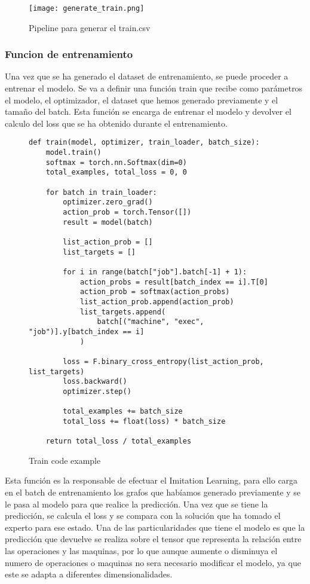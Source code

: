 \begin{figure}[ht]
    \centering
    \texttt{[image: generate\_train.png]}
    \caption{Pipeline para generar el train.csv}
    \label{fig:trainingpipeline}
\end{figure}

\subsubsection{Funcion de entrenamiento}
Una vez que se ha generado el dataset de entrenamiento, se puede proceder a entrenar el modelo.
Se va a definir una función train que recibe como parámetros el modelo, el optimizador, el dataset
que hemos generado previamente y el tamaño del batch. Esta función se encarga de entrenar el modelo
y devolver el calculo del loss que se ha obtenido durante el entrenamiento.\medskip

\begin{figure}[ht]
\begin{lstlisting}
def train(model, optimizer, train_loader, batch_size):
    model.train()
    softmax = torch.nn.Softmax(dim=0)
    total_examples, total_loss = 0, 0

    for batch in train_loader:
        optimizer.zero_grad()
        action_prob = torch.Tensor([])
        result = model(batch)

        list_action_prob = []
        list_targets = []

        for i in range(batch["job"].batch[-1] + 1):
            action_probs = result[batch_index == i].T[0]
            action_prob = softmax(action_probs)
            list_action_prob.append(action_prob)
            list_targets.append(
                batch[("machine", "exec", "job")].y[batch_index == i]
            )

        loss = F.binary_cross_entropy(list_action_prob, list_targets)
        loss.backward()
        optimizer.step()

        total_examples += batch_size
        total_loss += float(loss) * batch_size

    return total_loss / total_examples 
\end{lstlisting}\medskip
    \caption{Train code example}
    \label{fig:traincode}
\end{figure}

Esta función es la responsable de efectuar el Imitation Learning, para ello carga en el
batch de entrenamiento los grafos que habíamos generado previamente y se le pasa al modelo para que
realice la predicción. Una vez que se tiene la predicción, se calcula el loss y se compara
con la solución que ha tomado el experto para ese estado. Una de las particularidades que
tiene el modelo es que la predicción que devuelve se realiza sobre el tensor que representa
la relación entre las operaciones y las maquinas, por lo que aunque aumente o disminuya 
el numero de operaciones o maquinas no sera necesario modificar el modelo, ya que este 
se adapta a diferentes dimensionalidades.

